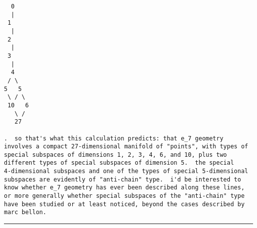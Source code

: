 \begin{verbatim}
  0
  |
 1
  |
 2
  |
 3
  |
  4
 / \
5   5
 \ / \
 10   6
   \ /
   27

.  so that's what this calculation predicts: that e_7 geometry
involves a compact 27-dimensional manifold of "points", with types of
special subspaces of dimensions 1, 2, 3, 4, 6, and 10, plus two
different types of special subspaces of dimension 5.  the special
4-dimensional subspaces and one of the types of special 5-dimensional
subspaces are evidently of "anti-chain" type.  i'd be interested to
know whether e_7 geometry has ever been described along these lines,
or more generally whether special subspaces of the "anti-chain" type
have been studied or at least noticed, beyond the cases described by
marc bellon.

\end{verbatim}
    
\par\noindent\rule{\textwidth}{0.4pt}


